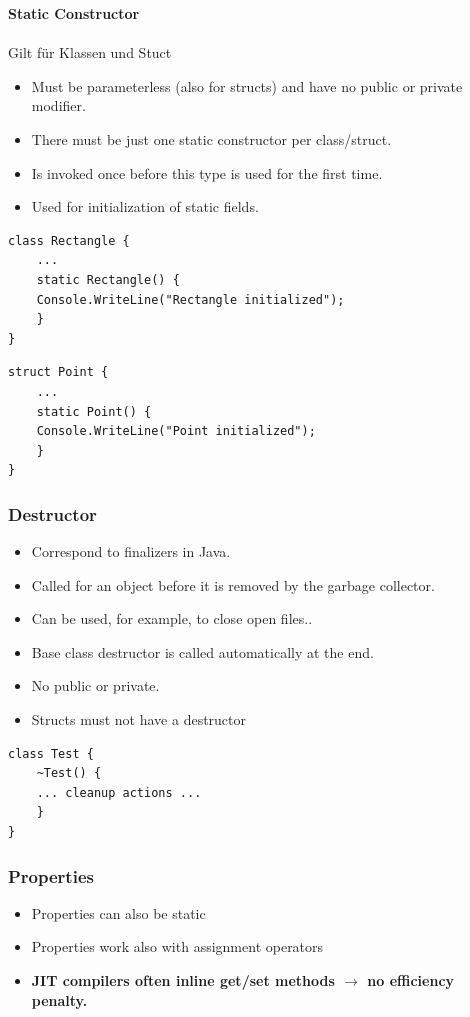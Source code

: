 \textbf{Static Constructor}\\ \\
Gilt für Klassen und Stuct
\begin{itemize}
	\item Must be parameterless (also for structs) and have no public or private modifier.
	\item There must be just one static constructor per class/struct.
	\item Is invoked once before this type is used for the first time.
	\item Used for initialization of static fields.
\end{itemize}

\begin{multicols}{2}
\begin{lstlisting}
class Rectangle {
	...
	static Rectangle() {
	Console.WriteLine("Rectangle initialized");
	}
}
\end{lstlisting}
\columnbreak
\begin{lstlisting}
struct Point {
	...
	static Point() {
	Console.WriteLine("Point initialized");
	}
}
\end{lstlisting}
\end{multicols}

\subsubsection{Destructor}
\begin{itemize}
	\item Correspond to finalizers in Java.
	\item Called for an object before it is removed by the garbage collector.
	\item Can be used, for example, to close open files..
	\item Base class destructor is called automatically at the end.
	\item No public or private.
	\item Structs must not have a destructor
\end{itemize}
\begin{lstlisting}
class Test {
	~Test() {
	... cleanup actions ...
	}
}
\end{lstlisting}

\subsubsection{Properties}
\begin{itemize}
	\item Properties can also be static
	\item Properties work also with assignment operators
	\item \textbf{JIT compilers often inline get/set methods $\rightarrow$ no efficiency penalty. }
\end{itemize}


